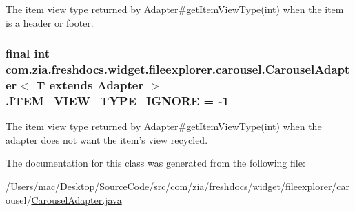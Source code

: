 The item view type returned by \hyperlink{}{Adapter\#get\-Item\-View\-Type(int)} when the item is a header or footer. \hypertarget{classcom_1_1zia_1_1freshdocs_1_1widget_1_1fileexplorer_1_1carousel_1_1_carousel_adapter_3_01_t_01extends_01_adapter_01_4_a89ab93e791d3a881858e410b3b6026d0}{
\subsubsection[{I\-T\-E\-M\-\_\-\-V\-I\-E\-W\-\_\-\-T\-Y\-P\-E\-\_\-\-I\-G\-N\-O\-R\-E}]{\setlength{\rightskip}{0pt plus 5cm}final int com.\-zia.\-freshdocs.\-widget.\-fileexplorer.\-carousel.\-Carousel\-Adapter$<$ T extends Adapter $>$.I\-T\-E\-M\-\_\-\-V\-I\-E\-W\-\_\-\-T\-Y\-P\-E\-\_\-\-I\-G\-N\-O\-R\-E = -\/1\hspace{0.3cm}{\ttfamily [static]}}}\label{classcom_1_1zia_1_1freshdocs_1_1widget_1_1fileexplorer_1_1carousel_1_1_carousel_adapter_3_01_t_01extends_01_adapter_01_4_a89ab93e791d3a881858e410b3b6026d0}
The item view type returned by \hyperlink{}{Adapter\#get\-Item\-View\-Type(int)} when the adapter does not want the item's view recycled. 

The documentation for this class was generated from the following file\-:\begin{DoxyCompactItemize}
\item 
/\-Users/mac/\-Desktop/\-Source\-Code/src/com/zia/freshdocs/widget/fileexplorer/carousel/\hyperlink{_carousel_adapter_8java}{Carousel\-Adapter.\-java}\end{DoxyCompactItemize}
